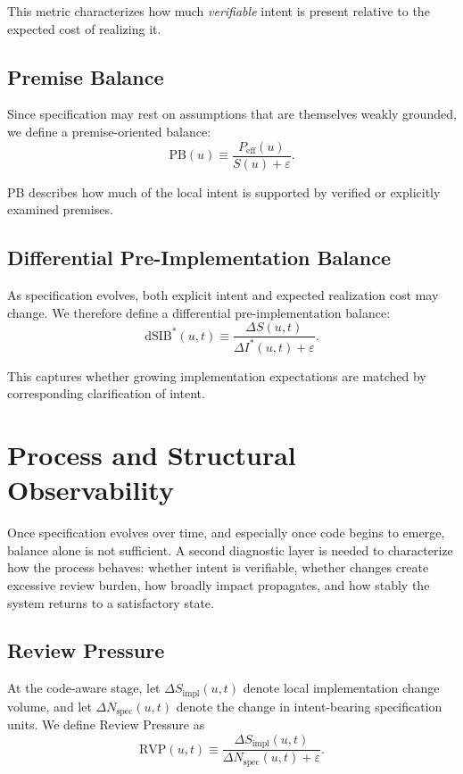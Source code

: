 \documentclass[twocolumn]{aastex701}
\begin{document}
This metric characterizes how much \emph{verifiable} intent is present
relative to the expected cost of realizing it.

\subsection{Premise Balance}

Since specification may rest on assumptions that are themselves weakly grounded,
we define a premise-oriented balance:
\begin{equation}
\mathrm{PB}(u) \equiv \frac{P_{\mathrm{eff}}(u)}{S(u)+\varepsilon}.
\end{equation}

PB describes how much of the local intent is supported
by verified or explicitly examined premises.

\subsection{Differential Pre-Implementation Balance}

As specification evolves, both explicit intent and expected realization cost may change.
We therefore define a differential pre-implementation balance:
\begin{equation}
\mathrm{dSIB}^\ast(u,t) \equiv
\frac{\Delta S(u,t)}{\Delta I^\ast(u,t)+\varepsilon}.
\end{equation}

This captures whether growing implementation expectations
are matched by corresponding clarification of intent.

\section{Process and Structural Observability}

Once specification evolves over time, and especially once code begins to emerge,
balance alone is not sufficient.
A second diagnostic layer is needed to characterize how the process behaves:
whether intent is verifiable, whether changes create excessive review burden,
how broadly impact propagates, and how stably the system returns to a
satisfactory state.

\subsection{Review Pressure}

At the code-aware stage, let $\Delta S_{\mathrm{impl}}(u,t)$ denote
local implementation change volume,
and let $\Delta N_{\mathrm{spec}}(u,t)$ denote the change in
intent-bearing specification units.
We define Review Pressure as
\begin{equation}
\mathrm{RVP}(u,t) \equiv
\frac{\Delta S_{\mathrm{impl}}(u,t)}
{\Delta N_{\mathrm{spec}}(u,t)+\varepsilon}.
\end{equation}
\end{document}
